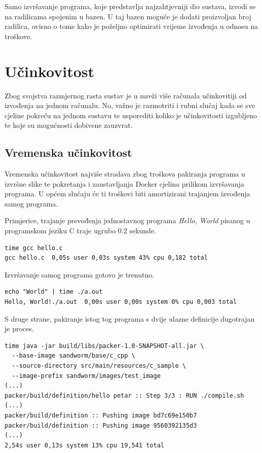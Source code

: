 \documentclass[times, utf8, zavrsni]{fer}
\begin{document}
{{Samo izvršavanje programa, koje predstavlja najzahtjevniji dio sustava, izvodi se na radilicama spojenim u bazen. U taj bazen moguće je dodati proizvoljan broj radilica, ovisno o tome kako je poželjno optimirati vrijeme izvođenja u odnosu na troškove.

\section{Učinkovitost}

Zbog svojstva razmjernog rasta sustav je u mreži više računala učinkovitiji od izvođenja na jednom računalu. No, važno je razmotriti i rubni slučaj kada se sve cjeline pokreću na jednom sustavu te usporediti koliko je učinkovitosti izgubljeno te koje su mogućnosti dobivene zauzvrat.

\subsection{Vremenska učinkovitost}

Vremenska učinkovitost najviše stradava zbog troškova pakiranja programa u izvršne slike te pokretanja i zaustavljanja Docker cjelina prilikom izvršavanja programa. U općem slučaju će ti troškovi biti amortizirani trajanjem izvođenja samog programa.

Primjerice, trajanje prevođenja jednostavnog programa {\textit{Hello, World}} pisanog u programskom jeziku C traje ugrubo 0.2 sekunde.

\begin{lstlisting}
time gcc hello.c 
gcc hello.c  0,05s user 0,03s system 43% cpu 0,182 total
\end{lstlisting}

Izvršavanje samog programa gotovo je trenutno.

\begin{lstlisting}
echo "World" | time ./a.out
Hello, World!./a.out  0,00s user 0,00s system 0% cpu 0,003 total
\end{lstlisting}

S druge strane, pakiranje istog tog programa s dvije ulazne definicije dugotrajan je proces.

\begin{lstlisting}
time java -jar build/libs/packer-1.0-SNAPSHOT-all.jar \
  --base-image sandworm/base/c_cpp \
  --source-directory src/main/resources/c_sample \
  --image-prefix sandworm/images/test_image
(...)
packer/build/definition/hello petar :: Step 3/3 : RUN ./compile.sh
(...)
packer/build/definition :: Pushing image bd7c69e150b7
packer/build/definition :: Pushing image 9560392135d3
(...)
2,54s user 0,13s system 13% cpu 19,541 total
\end{lstlisting}

}}
\end{document}

